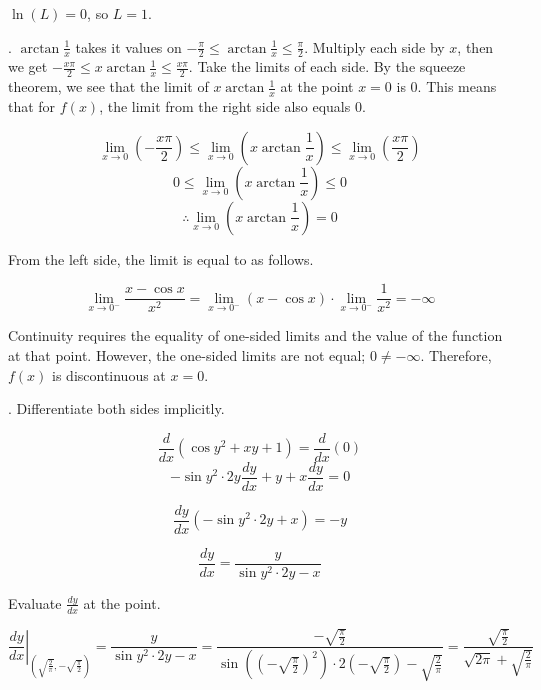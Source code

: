 \documentclass{article}
\begin{document}
\hfill

\noindent $\ln(L)=0$, so $\boxed{L=1}$.

\hfill

. $\displaystyle \arctan\frac1x$ takes it values on $\displaystyle -\frac{\pi}2 \leq \arctan\frac1x \leq \frac{\pi}2$. Multiply each side by $x$, then we get $\displaystyle -\frac{x\pi}2 \leq x\arctan\frac1x \leq \frac{x\pi}2$. Take the limits of each side. By the squeeze theorem, we see that the limit of $\displaystyle x\arctan\frac1x$ at the point $x=0$ is $0$. This means that for $f(x)$, the limit from the right side also equals $0$.

\[\lim_{x\to 0}\left(-\frac{x\pi}2\right)\leq\lim_{x\to 0}\left(x\arctan\frac1x\right)\leq\lim_{x\to 0}\left(\frac{x\pi}2\right)\]
\[0\leq\lim_{x\to 0}\left(x\arctan\frac1x\right)\leq0\]
\[\therefore\lim_{x\to 0}\left(x\arctan\frac1x\right) = 0\]

\hfill

\noindent From the left side, the limit is equal to as follows.

\[\lim_{x\to0^-}\frac{x-\cos x}{x^2}=\lim_{x\to0^-}(x-\cos x)\cdot\lim_{x\to0^-}\frac1{x^2} =-\infty\]

\hfill

\noindent Continuity requires the equality of one-sided limits and the value of the function at that point. However, the one-sided limits are not equal; $0\neq-\infty$. Therefore, $f(x)$ is discontinuous at $x=0$.

\hfill

. Differentiate both sides implicitly.

\[\frac{d}{dx}\left(\cos y^2+xy+1\right)=\frac{d}{dx}(0)\]
\[-\sin y^2\cdot2y\frac{dy}{dx}+y+x\frac{dy}{dx}=0\]

\[\frac{dy}{dx}\left(-\sin y^2\cdot2y+x\right)=-y\]

\begin{equation}\frac{dy}{dx}= \frac y{\sin y^2 \cdot 2y - x}\end{equation}

\hfill

\noindent Evaluate $\displaystyle \frac{dy}{dx}$ at the point.

\begin{equation}\left.\frac{dy}{dx}\right|_{\left(\sqrt{\frac{2}{\pi}},-\sqrt{\frac{\pi}{2}}\right)} =\frac y{\sin y^2\cdot2y-x}=\frac{-\sqrt{\frac{\pi}{2}}}{\sin\left(\left(-\sqrt{\frac{\pi}{2}}\right)^2\right)\cdot2\left(-\sqrt{\frac{\pi}{2}}\right)-\sqrt{\frac{2}{\pi}}} =\frac{\sqrt{\frac{\pi}{2}}}{\sqrt{2\pi}+\sqrt{\frac{2}{\pi}}}\end{equation}
\end{document}
